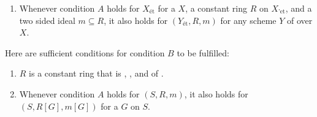 \begin{definition}
\begin{enumerate}
    \item Whenever condition $A$ holds for $X_{\text{\'et}}$ for a  $X$, a constant ring $R$ on $X_{\text{'et}}$, and a two sided ideal $m \subseteq R$, it also holds for $(Y_{\text{\'et}}, R, m)$ for any scheme $Y$ of  over $X$.
   \end{enumerate}

   Here are sufficient conditions for condition $B$ to be fulfilled:
   \begin{enumerate}
    \item $R$ is a constant ring that is , , and  of .
    \item Whenever condition $A$ holds for $(S, R, m)$, it also holds for $(S, R[G], m[G])$ for a  $G$ on $S$.
   \end{enumerate}

\end{definition}
